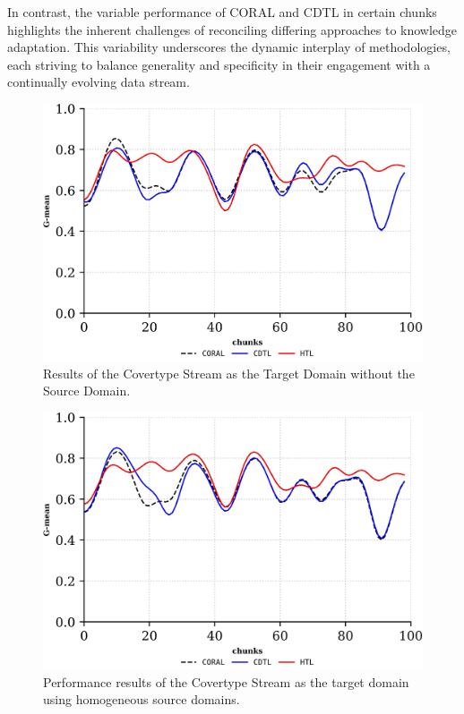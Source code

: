 In contrast, the variable performance of CORAL and CDTL in certain chunks highlights the inherent challenges of reconciling differing approaches to knowledge adaptation. This variability underscores the dynamic interplay of methodologies, each striving to balance generality and specificity in their engagement with a continually evolving data stream.
\begin{figure}[H]
	\centering
	\includegraphics[width=0.6\linewidth]{6_transfer_learning/figures/exp1_0.png}
  \caption{Results of the Covertype Stream as the Target Domain without the Source Domain.}

	\label{fig:6_exp1}
\end{figure}
\begin{figure}[H]
	\centering
	\includegraphics[width=0.6\linewidth]{6_transfer_learning/figures/exp1_1.png}
	\caption{Performance results of the Covertype Stream as the target domain using homogeneous source domains.}

	\label{fig:6_exp2}
\end{figure}

